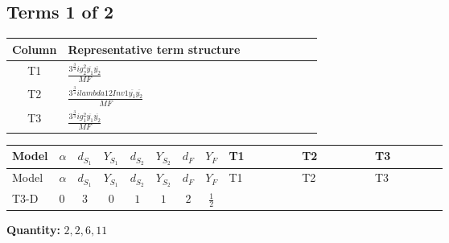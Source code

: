\documentclass[8pt]{article}
\begin{document}
\begin{landscape}
\subsection*{Terms 1 of 2}
\begin{center}
\begin{tabular}{@{}c >{\raggedright\arraybackslash}p{0.82\linewidth}@{}}
\toprule
Column & Representative term structure \\
\midrule
T1 & \(\displaystyle \frac{3^{\frac{3}{4}} i g_{2}^{2} \overline{y_{1}} \overline{y_{2}}}{MF}\) \\
\midrule
T2 & \(\displaystyle \frac{3^{\frac{3}{4}} i lambda12Inv1 \overline{y_{1}} \overline{y_{2}}}{MF}\) \\
\midrule
T3 & \(\displaystyle \frac{3^{\frac{3}{4}} i g_{1}^{2} \overline{y_{1}} \overline{y_{2}}}{MF}\) \\
\midrule
\bottomrule
\end{tabular}
\end{center}
\smallskip
\tiny
\begin{longtable}{@{}llcccccc >{\raggedright\arraybackslash}p{0.21\linewidth} >{\raggedright\arraybackslash}p{0.21\linewidth} >{\raggedright\arraybackslash}p{0.21\linewidth}@{}}
\toprule
Model & $\alpha$ & $d_{S_1}$ & $Y_{S_1}$ & $d_{S_2}$ & $Y_{S_2}$ & $d_F$ & $Y_F$ & T1 & T2 & T3 \\
\midrule
\endfirsthead
\toprule
Model & $\alpha$ & $d_{S_1}$ & $Y_{S_1}$ & $d_{S_2}$ & $Y_{S_2}$ & $d_F$ & $Y_F$ & T1 & T2 & T3 \\
\midrule
\endhead
T3-D & $0$ & $3$ & $0$ & $1$ & $1$ & $2$ & $\frac{1}{2}$ & \scriptsize\adjustbox{max width=\linewidth}{$\begin{gathered} - \frac{11 \cdot 3^{\frac{3}{4}} i g_{2}^{2} \overline{y_{1}} \overline{y_{2}}}{8 MF}\end{gathered}$} & \scriptsize\adjustbox{max width=\linewidth}{$\begin{gathered} - \frac{3^{\frac{3}{4}} i lambda12Inv1 \overline{y_{1}} \overline{y_{2}}}{6 MF}\end{gathered}$} & \scriptsize\adjustbox{max width=\linewidth}{$\begin{gathered} - \frac{3^{\frac{3}{4}} i g_{1}^{2} \overline{y_{1}} \overline{y_{2}}}{8 MF}\end{gathered}$} \\
\midrule
\bottomrule
\end{longtable}
\clearpage
\noindent\textbf{Quantity: }$\mathrm{2,2,6,11}$\par\smallskip

\end{landscape}
\end{document}
